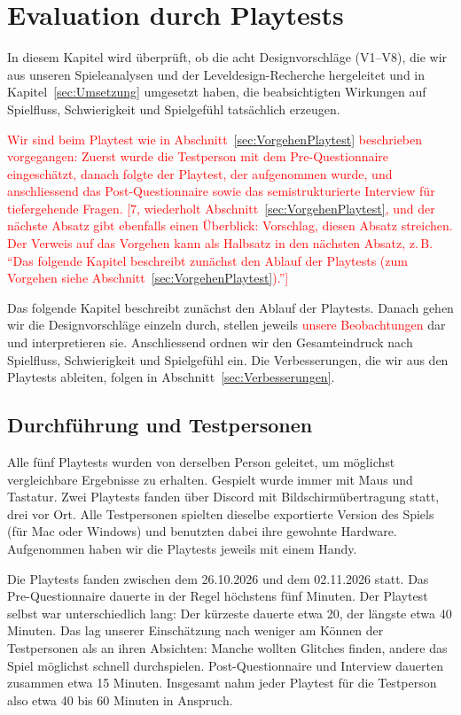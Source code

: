 \documentclass[../Main.tex]{subfiles}
\begin{document}
\section{Evaluation durch Playtests} \label{sec:Evaluation}

In diesem Kapitel wird überprüft, ob die acht Designvorschläge (V1--V8), die wir aus unseren Spieleanalysen und der Leveldesign-Recherche hergeleitet und in Kapitel~\ref{sec:Umsetzung} umgesetzt haben, die beabsichtigten Wirkungen auf Spielfluss, Schwierigkeit und Spielgefühl tatsächlich erzeugen.

\textcolor{red}{Wir sind beim Playtest wie in Abschnitt~\ref{sec:VorgehenPlaytest} beschrieben vorgegangen: Zuerst wurde die Testperson mit dem Pre-Questionnaire eingeschätzt, danach folgte der Playtest, der aufgenommen wurde, und anschliessend das Post-Questionnaire sowie das semistrukturierte Interview für tiefergehende Fragen. [7, wiederholt Abschnitt~\ref{sec:VorgehenPlaytest}, und der nächste Absatz gibt ebenfalls einen Überblick: Vorschlag, diesen Absatz streichen. Der Verweis auf das Vorgehen kann als Halbsatz in den nächsten Absatz, z.\,B. \enquote{Das folgende Kapitel beschreibt zunächst den Ablauf der Playtests (zum Vorgehen siehe Abschnitt~\ref{sec:VorgehenPlaytest}).}]}

Das folgende Kapitel beschreibt zunächst den Ablauf der Playtests. Danach gehen wir die Designvorschläge einzeln durch, stellen jeweils \textcolor{red}{unsere Beobachtungen} dar und interpretieren sie. Anschliessend ordnen wir den Gesamteindruck nach Spielfluss, Schwierigkeit und Spielgefühl ein. Die Verbesserungen, die wir aus den Playtests ableiten, folgen in Abschnitt~\ref{sec:Verbesserungen}.

\subsection{Durchführung und Testpersonen} \label{sec:Durchfuehrung}

Alle fünf Playtests wurden von derselben Person geleitet, um möglichst vergleichbare Ergebnisse zu erhalten. Gespielt wurde immer mit Maus und Tastatur. Zwei Playtests fanden über Discord mit Bildschirmübertragung statt, drei vor Ort. Alle Testpersonen spielten dieselbe exportierte Version des Spiels (für Mac oder Windows) und benutzten dabei ihre gewohnte Hardware. Aufgenommen haben wir die Playtests jeweils mit einem Handy.

Die Playtests fanden zwischen dem 26.10.2026 und dem 02.11.2026 statt. Das Pre-Questionnaire dauerte in der Regel höchstens fünf Minuten. Der Playtest selbst war unterschiedlich lang: Der kürzeste dauerte etwa 20, der längste etwa 40 Minuten. Das lag unserer Einschätzung nach weniger am Können der Testpersonen als an ihren Absichten: Manche wollten Glitches finden, andere das Spiel möglichst schnell durchspielen. Post-Questionnaire und Interview dauerten zusammen etwa 15 Minuten. Insgesamt nahm jeder Playtest für die Testperson also etwa 40 bis 60 Minuten in Anspruch.
\end{document}

